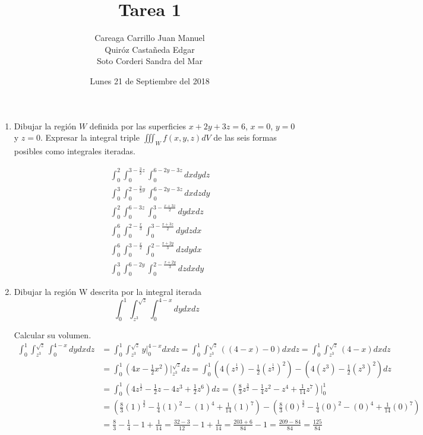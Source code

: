 \documentclass{article}
\begin{document}
\title{Tarea 1}
        \author{Careaga Carrillo Juan Manuel \\ Quiróz Castañeda Edgar \\ Soto Corderi Sandra del Mar}
        \date{Lunes 21 de Septiembre del 2018}
        \maketitle

	\begin{enumerate}
   	\item {
   Dibujar la región $W$ definida por las superficies $x + 2y + 3z = 6$,
	 $x = 0$, $y = 0$ y $z = 0$.
	 Expresar la integral triple $\iiint_Wf(x,y,z)dV$ de las seis formas posibles
	 como integrales iteradas.

	 \begin{align*}
		 &\int_{0}^{2} \int_{0}^{3-\frac{3}{2}z} \int_{0}^{6-2y-3z} dxdydz\\
		 &\int_{0}^{3} \int_{0}^{2-\frac{2}{3}y} \int_{0}^{6-2y-3z} dxdzdy\\
		 &\int_{0}^{2} \int_{0}^{6-3z} \int_{0}^{3-\frac{x+3z}{2}} dydxdz\\
		 &\int_{0}^{6} \int_{0}^{2-\frac{x}{3}} \int_{0}^{3-\frac{x+3z}{2}} dydzdx\\
		 &\int_{0}^{6} \int_{0}^{3-\frac{x}{2}} \int_{0}^{2-\frac{x+2y}{3}} dzdydx\\
		 &\int_{0}^{3} \int_{0}^{6-2y} \int_{0}^{2-\frac{x+2y}{3}} dzdxdy
	 \end{align*}

	}

   \item {
    Dibujar la región W descrita por la integral iterada
    \begin{equation*}
    	\int_{0}^{1} \int_{z^3}^{\sqrt{z}} \int_{0}^{4-x} dydxdz
		\end{equation*}

    Calcular su volumen.
		\begin{align*}
			\int_{0}^{1} \int_{z^3}^{\sqrt{z}} \int_{0}^{4-x} dydxdz
			&= \int_{0}^{1} \int_{z^3}^{\sqrt{z}} y \Big|_{0}^{4-x} dxdz
			 = \int_{0}^{1} \int_{z^3}^{\sqrt{z}} ((4-x)-0) dxdz
			 = \int_{0}^{1} \int_{z^3}^{\sqrt{z}} (4-x) dxdz\\
			&= \int_{0}^{1} (4x - \frac{1}{2}x^2) \Big |_{z^3}^{\sqrt{z}} dz
			 = \int_{0}^{1} (4(z^{\frac{1}{2}}) - \frac{1}{2}(z^{\frac{1}{2}})^2) - (4(z^3)
			 - \frac{1}{2}(z^3)^2) dz\\
			&= \int_{0}^{1} (4z^{\frac{1}{2}} - \frac{1}{2}z - 4z^3 + \frac{1}{2}z^6) dz
			 = (\frac{8}{3}z^{\frac{3}{2}} - \frac{1}{4}z^2 - z^4 + \frac{1}{14}z^7) \Big |_{0}^{1}\\
			&= (\frac{8}{3}(1)^{\frac{3}{2}} - \frac{1}{4}(1)^2 - (1)^4 + \frac{1}{14}(1)^7)
			- (\frac{8}{3}(0)^{\frac{3}{2}} - \frac{1}{4}(0)^2 - (0)^4 + \frac{1}{14}(0)^7)\\
			&= \frac{8}{3} - \frac{1}{4} - 1 + \frac{1}{14} = \frac{32-3}{12} - 1 + \frac{1}{14}
			 = \frac{203+6}{84} - 1 = \frac{209 - 84}{84} = \frac{125}{84}
		\end{align*}

}
\end{enumerate}
\end{document}
